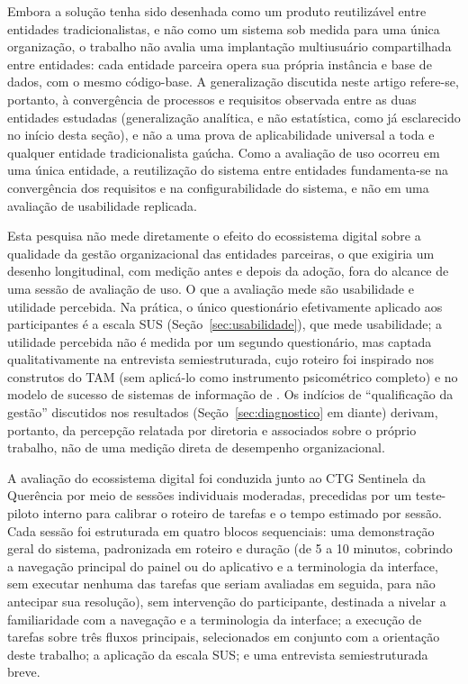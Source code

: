 \documentclass[12pt,a4paper]{article}
\begin{document}
Embora a solução tenha sido desenhada como um produto reutilizável entre entidades tradicionalistas,
e não como um sistema sob medida para uma única organização, o trabalho não avalia uma implantação
multiusuário compartilhada entre entidades: cada entidade parceira opera sua própria instância e base
de dados, com o mesmo código-base. A generalização discutida neste artigo refere-se, portanto, à
convergência de processos e requisitos observada entre as duas entidades estudadas (generalização
analítica, e não estatística, como já esclarecido no início desta seção), e não a uma prova de
aplicabilidade universal a toda e qualquer entidade tradicionalista gaúcha. Como a avaliação de uso
ocorreu em uma única entidade, a reutilização do sistema entre entidades fundamenta-se na convergência
dos requisitos e na configurabilidade do sistema, e não em uma avaliação de usabilidade replicada.

Esta pesquisa não mede diretamente o efeito do ecossistema digital sobre a qualidade da gestão
organizacional das entidades parceiras, o que exigiria um desenho longitudinal, com medição antes e
depois da adoção, fora do alcance de uma sessão de avaliação de uso. O que a avaliação mede são
usabilidade e utilidade percebida. Na prática, o único questionário efetivamente aplicado aos
participantes é a escala SUS (Seção~\ref{sec:usabilidade}), que mede usabilidade; a utilidade
percebida não é medida por um segundo questionário, mas captada qualitativamente na entrevista
semiestruturada, cujo roteiro foi inspirado nos construtos do TAM (sem aplicá-lo como instrumento
psicométrico completo) e no modelo de sucesso de sistemas de informação de \textcite{delone2003}.
Os indícios de ``qualificação da gestão'' discutidos nos resultados (Seção~\ref{sec:diagnostico} em
diante) derivam, portanto, da percepção relatada por diretoria e associados sobre o próprio trabalho,
não de uma medição direta de desempenho organizacional.

A avaliação do ecossistema digital foi conduzida junto ao CTG Sentinela da Querência por meio de
sessões individuais moderadas, precedidas por um teste-piloto interno para calibrar o roteiro de
tarefas e o tempo estimado por sessão. Cada sessão foi estruturada em quatro blocos sequenciais: uma
demonstração geral do sistema, padronizada em roteiro e duração (de 5 a 10 minutos, cobrindo a
navegação principal do painel ou do aplicativo e a terminologia da interface, sem executar nenhuma das
tarefas que seriam avaliadas em seguida, para não antecipar sua resolução), sem intervenção do
participante, destinada a nivelar a familiaridade com a navegação e a terminologia da interface; a
execução de tarefas sobre três fluxos principais, selecionados em conjunto com a orientação deste
trabalho; a aplicação da escala SUS; e uma entrevista semiestruturada breve.
\end{document}
